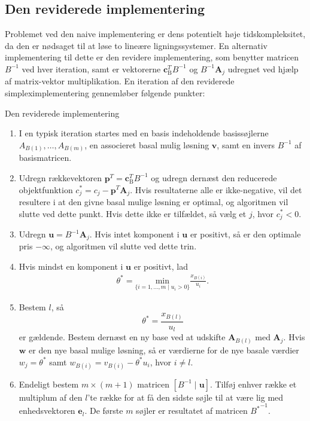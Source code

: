 \subsection{Den reviderede implementering}
Problemet ved den naive implementering er dens potentielt høje tidskompleksitet, da den er nødsaget til at løse to lineære ligningssystemer.
En alternativ implementering til dette er den revidere implementering, som benytter matricen $B^{-1}$ ved hver iteration, samt er vektorerne $\mathbf{c}_{\text{B}}^T B^{-1}$ og $B^{-1} \mathbf{A}_j$ udregnet ved hjælp af matrix-vektor multiplikation.
En iteration af den reviderede simpleximplementering gennemløber følgende punkter: 
% 
\begin{col}{Den reviderede implementering}{}
\begin{enumerate}
\item I en typisk iteration startes med en basis indeholdende basissøjlerne $A_{B(1)},\ldots,A_{B(m)}$, en associeret basal mulig løsning $\mathbf{v}$, samt en invers $B^{-1}$ af basismatricen. 
\item Udregn rækkevektoren $\mathbf{p}^T=\mathbf{c}_{\text{B}}^T B^{-1}$ og udregn dernæst den reducerede objektfunktion $c_j^* = c_j - \mathbf{p}^T \mathbf{A}_j$.
Hvis resultaterne alle er ikke-negative, vil det resultere i at den givne basal mulige løsning er optimal, og algoritmen vil slutte ved dette punkt. Hvis dette ikke er tilfældet, så vælg et $j$, hvor $c_j^* < 0$.
\item Udregn $\mathbf{u}=B^{-1}\mathbf{A}_j$.
Hvis intet komponent i $\mathbf{u}$ er positivt, så er den optimale pris $-\infty$, og algoritmen vil slutte ved dette trin. 
%
%
\item Hvis mindst en komponent i $\mathbf{u}$ er positivt, lad 
\begin{align*}
\theta^*=\underset{\{i=1,\ldots,m \mid u_i>0\}}{\text{min}}\frac{x_{B(i)}}{u_i}.
\end{align*}
\item Bestem $l$, så $$\theta^*=\frac{x_{B(l)}}{u_l}$$ er gældende. Bestem dernæst en ny base ved at udskifte $\mathbf{A}_{B(l)}$ med $\mathbf{A}_j$. Hvis $\mathbf{w}$ er den nye basal mulige løsning, så er værdierne for de nye basale værdier $w_j=\theta^*$ samt $w_{B(i)}=v_{B(i)}-\theta^*u_i$, hvor $i \neq l$.
\item Endeligt bestem $m \times (m+1)$ matricen $\left [B^{-1} \mid \mathbf{u} \right ]$.
Tilføj enhver række et multiplum af den $l$'te række for at få den sidste søjle til at være lig med enhedsvektoren $\mathbf{e}_l$.
De første $m$ søjler er resultatet af matricen ${B^*}^{-1}$.
\end{enumerate}
\end{col}
\noindent
%
%
